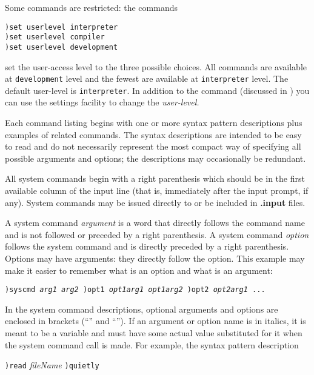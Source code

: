 Some commands are restricted: the commands
\begin{verbatim}
)set userlevel interpreter
)set userlevel compiler
)set userlevel development
\end{verbatim}
set the user-access level to the three possible choices.
All commands are available at {\tt development} level and the fewest
are available at {\tt interpreter} level.
The default user-level is {\tt interpreter}.
In addition to the  command (discussed in )
you can use the \HyperName{} settings facility to change the {\it user-level.}


Each command listing begins with one or more syntax pattern descriptions
plus examples of related commands.
The syntax descriptions are intended to be easy to read and do not
necessarily represent the most compact way of specifying all
possible arguments and options; the descriptions may occasionally
be redundant.

All system commands begin with a right parenthesis which should be in
the first available column of the input line (that is, immediately
after the input prompt, if any).
System commands may be issued directly to \Language{} or be
included in {\bf .input} files.

A system command {\it argument} is a word that directly
follows the command name and is not followed or preceded by a
right parenthesis.
A system command {\it option} follows the system command and
is directly preceded by a right parenthesis.
Options may have arguments: they directly follow the option.
This example may make it easier to remember what is an option and
what is an argument:

\begin{center}
{\tt )syscmd {\it arg1 arg2} )opt1 {\it opt1arg1 opt1arg2} )opt2 {\it opt2arg1} ...}
\end{center}

In the system command descriptions, optional arguments and options are
enclosed in brackets (``\lanb'' and ``\ranb'').
If an argument or option name is in italics, it is
meant to be a variable and must have some actual value substituted
for it when the system command call is made.
For example, the syntax pattern description

\noindent
{\tt )read} {\it fileName} {\tt \lanb{})quietly\ranb{}}

